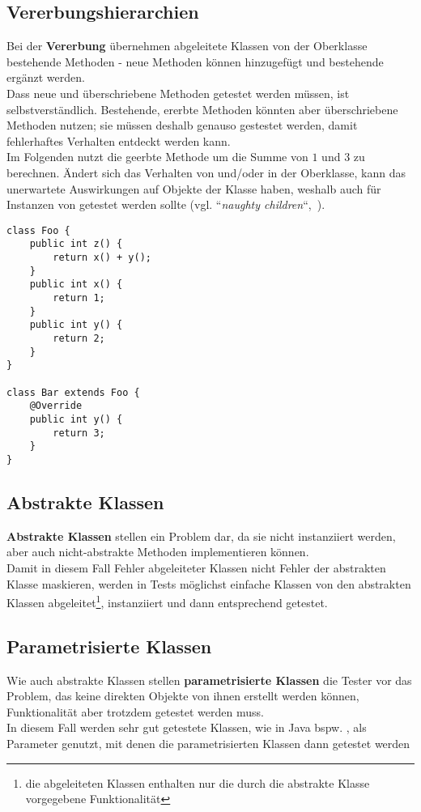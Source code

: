 \subsection*{Vererbungshierarchien}
Bei der \textbf{Vererbung} übernehmen abgeleitete Klassen von der Oberklasse bestehende Methoden - neue Methoden können hinzugefügt und bestehende ergänzt werden.\\
Dass neue und überschriebene Methoden getestet werden müssen, ist selbstverständlich.
Bestehende, ererbte Methoden könnten aber überschriebene Methoden nutzen; sie müssen deshalb genauso gestestet werden, damit fehlerhaftes Verhalten entdeckt werden kann.\\
Im Folgenden nutzt  die geerbte Methode  um die Summe von $1$ und $3$ zu berechnen.
Ändert sich das Verhalten von  und/oder in der Oberklasse, kann das unerwartete Auswirkungen auf Objekte der Klasse  haben, weshalb auch  für  Instanzen von  getestet werden sollte (vgl. ``\textit{naughty children}``,~\cite[Table 17.2, 843]{Bin99}).

\begin{verbatim}
class Foo {
    public int z() {
        return x() + y();
    }
    public int x() {
        return 1;
    }
    public int y() {
        return 2;
    }
}

class Bar extends Foo {
    @Override
    public int y() {
        return 3;
    }
}
\end{verbatim}


\subsection*{Abstrakte Klassen}
\textbf{Abstrakte Klassen} stellen ein Problem dar, da sie nicht instanziiert werden, aber auch nicht-abstrakte Methoden implementieren können.\\
Damit in diesem Fall Fehler abgeleiteter Klassen nicht Fehler der abstrakten Klasse maskieren, werden in Tests möglichst einfache Klassen von den abstrakten Klassen abgeleitet\footnote{
    die abgeleiteten Klassen enthalten nur die durch die abstrakte Klasse vorgegebene Funktionalität
}, instanziiert und dann entsprechend getestet.

\subsection*{Parametrisierte Klassen}
Wie auch abstrakte Klassen stellen \textbf{parametrisierte Klassen} die Tester vor das Problem, das keine direkten Objekte von ihnen erstellt werden können, Funktionalität aber trotzdem getestet werden muss.\\
In diesem Fall werden sehr gut getestete Klassen, wie in Java bspw. , als Parameter genutzt, mit denen die parametrisierten Klassen dann getestet werden
